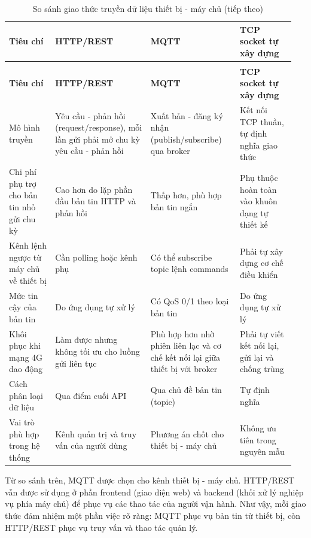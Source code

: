 \documentclass[a4paper]{extarticle}
\newcommand{\thesisterm}[1]{{\rmfamily #1}}
\newcommand{\thesissettableid}[2]{%
  \renewcommand{\thetable}{#1}%
  \renewcommand{\theHtable}{#2}%
}
\begin{document}
{\thesissettableid{3.19}{condensed-bang-3-19-so-sanh-giao-thuc-truyen-du-lieu-thiet-bi-may-chu}
\def\LTcaptype{table}
\begin{longtable}{|L{0.155\linewidth}|L{0.311\linewidth}|L{0.298\linewidth}|L{0.187\linewidth}|}
\caption{So sánh giao thức truyền dữ liệu thiết bị - máy chủ}\label{tab:condensed-bang-3-19-so-sanh-giao-thuc-truyen-du-lieu-thiet-bi-may-chu}\\
\hline
\textbf{Tiêu chí} & \textbf{HTTP/REST} & \textbf{MQTT} & \textbf{TCP socket tự xây dựng} \\
\hline
\endfirsthead
\caption[]{So sánh giao thức truyền dữ liệu thiết bị - máy chủ (tiếp theo)}\\
\hline
\textbf{Tiêu chí} & \textbf{HTTP/REST} & \textbf{MQTT} & \textbf{TCP socket tự xây dựng} \\
\hline
\endhead
\endfoot
\endlastfoot
Mô hình truyền & Yêu cầu - phản hồi (request/response), mỗi lần gửi phải mở chu kỳ yêu cầu - phản hồi & Xuất bản - đăng ký nhận (publish/subscribe) qua broker & Kết nối TCP thuần, tự định nghĩa giao thức \\\hline
Chi phí phụ trợ cho bản tin nhỏ gửi chu kỳ & Cao hơn do lặp phần đầu bản tin HTTP và phản hồi & Thấp hơn, phù hợp bản tin ngắn & Phụ thuộc hoàn toàn vào khuôn dạng tự thiết kế \\\hline
Kênh lệnh ngược từ máy chủ về thiết bị & Cần polling hoặc kênh phụ & Có thể subscribe topic lệnh \thesisterm{commands} & Phải tự xây dựng cơ chế điều khiển \\\hline
Mức tin cậy của bản tin & Do ứng dụng tự xử lý & Có QoS 0/1 theo loại bản tin & Do ứng dụng tự xử lý \\\hline
Khôi phục khi mạng 4G dao động & Làm được nhưng không tối ưu cho luồng gửi liên tục & Phù hợp hơn nhờ phiên liên lạc và cơ chế kết nối lại giữa thiết bị với broker & Phải tự viết kết nối lại, gửi lại và chống trùng \\\hline
Cách phân loại dữ liệu & Qua điểm cuối API & Qua chủ đề bản tin (topic) & Tự định nghĩa \\\hline
Vai trò phù hợp trong hệ thống & Kênh quản trị và truy vấn của người dùng & Phương án chốt cho thiết bị - máy chủ & Không ưu tiên trong nguyên mẫu \\\hline
\end{longtable}
}

Từ so sánh trên, MQTT được chọn cho kênh thiết bị - máy chủ. HTTP/REST vẫn được sử dụng ở phần frontend (giao diện web) và backend (khối xử lý nghiệp vụ phía máy chủ) để phục vụ các thao tác của người vận hành. Như vậy, mỗi giao thức đảm nhiệm một phần việc rõ ràng: MQTT phục vụ bản tin từ thiết bị, còn HTTP/REST phục vụ truy vấn và thao tác quản lý.
\end{document}
